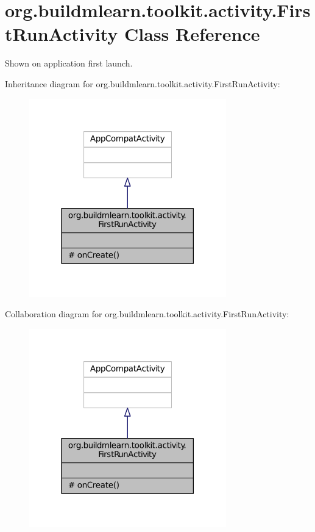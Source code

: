 \hypertarget{classorg_1_1buildmlearn_1_1toolkit_1_1activity_1_1FirstRunActivity}{\section{org.\-buildmlearn.\-toolkit.\-activity.\-First\-Run\-Activity Class Reference}
\label{classorg_1_1buildmlearn_1_1toolkit_1_1activity_1_1FirstRunActivity}
}


Shown on application first launch.  




Inheritance diagram for org.\-buildmlearn.\-toolkit.\-activity.\-First\-Run\-Activity\-:
\nopagebreak
\begin{figure}[H]
\begin{center}
\leavevmode
\includegraphics[width=242pt]{d7/d56/classorg_1_1buildmlearn_1_1toolkit_1_1activity_1_1FirstRunActivity__inherit__graph}
\end{center}
\end{figure}


Collaboration diagram for org.\-buildmlearn.\-toolkit.\-activity.\-First\-Run\-Activity\-:
\nopagebreak
\begin{figure}[H]
\begin{center}
\leavevmode
\includegraphics[width=242pt]{d1/d9d/classorg_1_1buildmlearn_1_1toolkit_1_1activity_1_1FirstRunActivity__coll__graph}
\end{center}
\end{figure}
